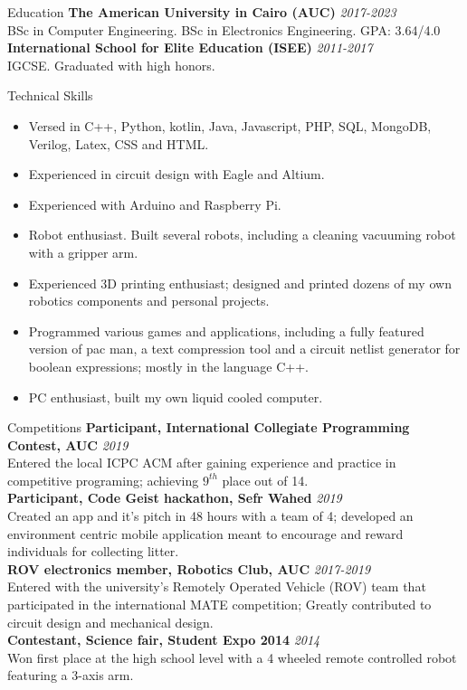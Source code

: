 \documentclass{resume}
\begin{document}
\begin{small}
	
	\begin{rSection}{Education}
		{\bf The American University in Cairo (AUC)} \hfill {\em 2017-2023} \\
		BSc in Computer Engineering. BSc in Electronics Engineering. GPA: 3.64/4.0\\
		{\bf International School for Elite Education (ISEE)} \hfill {\em 2011-2017}\\
		IGCSE. Graduated with high honors.
	\end{rSection}
	
	\begin{rSection}{Technical Skills}
		\begin{itemize}
			\itemsep-0.4em
			\item Versed in C++, Python, kotlin, Java, Javascript, PHP, SQL, MongoDB, Verilog, Latex, CSS and HTML.
			\item Experienced in circuit design with Eagle and Altium.
			\item Experienced with Arduino and Raspberry Pi.
			\item Robot enthusiast. Built several robots, including a cleaning vacuuming robot with a gripper arm.
			\item Experienced 3D printing enthusiast; designed and printed dozens of my own robotics components and personal projects.
			\item Programmed various games and applications, including a fully featured version of pac man, a text compression tool and a circuit netlist generator for boolean expressions; mostly in the language C++.
			\item PC enthusiast, built my own liquid cooled computer.
		\end{itemize}
	\end{rSection}

	\begin{rSection}{Competitions}
		{\bf Participant, International Collegiate Programming Contest, AUC} \hfill {\em 2019} \\
		Entered the local ICPC ACM after gaining experience and practice in competitive programing; achieving $9^{th}$ place out of 14. \\
		{\bf Participant, Code Geist hackathon, Sefr Wahed} \hfill {\em 2019} \\
		Created an app and it's pitch in 48 hours with a team of 4; developed an environment centric mobile application meant to encourage and reward individuals for collecting litter.\\
		{\bf ROV electronics member, Robotics Club, AUC} \hfill {\em 2017-2019} \\
		Entered with the university's Remotely Operated Vehicle (ROV) team that participated in the international MATE competition; Greatly contributed to circuit design and mechanical design. \\
		{\bf Contestant, Science fair, Student Expo 2014} \hfill {\em 2014} \\
		Won first place at the high school level with a 4 wheeled remote controlled robot featuring a 3-axis arm.
	\end{rSection}
	

\end{small}
\end{document}
